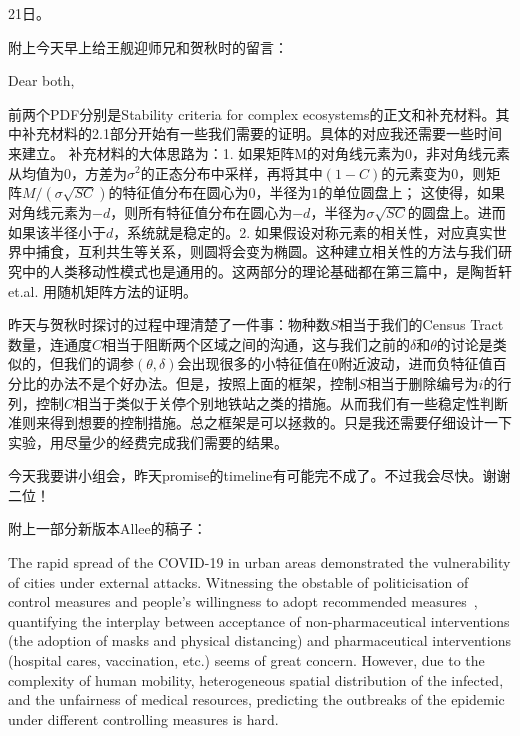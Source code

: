 21日。

附上今天早上给王舰迎师兄和贺秋时的留言：

Dear both, 

前两个PDF分别是Stability criteria for complex ecosystems的正文和补充材料。其中补充材料的2.1部分开始有一些我们需要的证明。具体的对应我还需要一些时间来建立。
补充材料的大体思路为：1. 如果矩阵M的对角线元素为0，非对角线元素从均值为0，方差为$\sigma^2$的正态分布中采样，再将其中$(1-C)$的元素变为$0$，则矩阵$M/(\sigma \sqrt{SC})$的特征值分布在圆心为$0$，半径为$1$的单位圆盘上； 这使得，如果对角线元素为$-d$，则所有特征值分布在圆心为$-d$，半径为$\sigma\sqrt{SC}$的圆盘上。进而如果该半径小于$d$，系统就是稳定的。2. 如果假设对称元素的相关性，对应真实世界中捕食，互利共生等关系，则圆将会变为椭圆。这种建立相关性的方法与我们研究中的人类移动性模式也是通用的。这两部分的理论基础都在第三篇中，是陶哲轩et.al. 用随机矩阵方法的证明。

昨天与贺秋时探讨的过程中理清楚了一件事：物种数$S$相当于我们的Census Tract数量，连通度$C$相当于阻断两个区域之间的沟通，这与我们之前的$\delta$和$\theta$的讨论是类似的，但我们的调参$(\theta, \delta)$会出现很多的小特征值在0附近波动，进而负特征值百分比的办法不是个好办法。但是，按照上面的框架，控制$S$相当于删除编号为$i$的行列，控制$C$相当于类似于关停个别地铁站之类的措施。从而我们有一些稳定性判断准则来得到想要的控制措施。总之框架是可以拯救的。只是我还需要仔细设计一下实验，用尽量少的经费完成我们需要的结果。

今天我要讲小组会，昨天promise的timeline有可能完不成了。不过我会尽快。谢谢二位！

\dotfill

附上一部分新版本Allee的稿子：

The rapid spread of the COVID-19 in urban areas demonstrated the vulnerability of cities under external attacks. Witnessing the obstable of politicisation of control measures and people's willingness to adopt recommended measures~\cite{wells2021interplay}, quantifying the interplay between acceptance of non-pharmaceutical interventions (the adoption of masks and physical distancing) and pharmaceutical interventions (hospital cares, vaccination, etc.) seems of great concern. However, due to the complexity of human mobility, heterogeneous spatial distribution of the infected, and the unfairness of medical resources, predicting the outbreaks of the epidemic under different controlling measures is hard.


